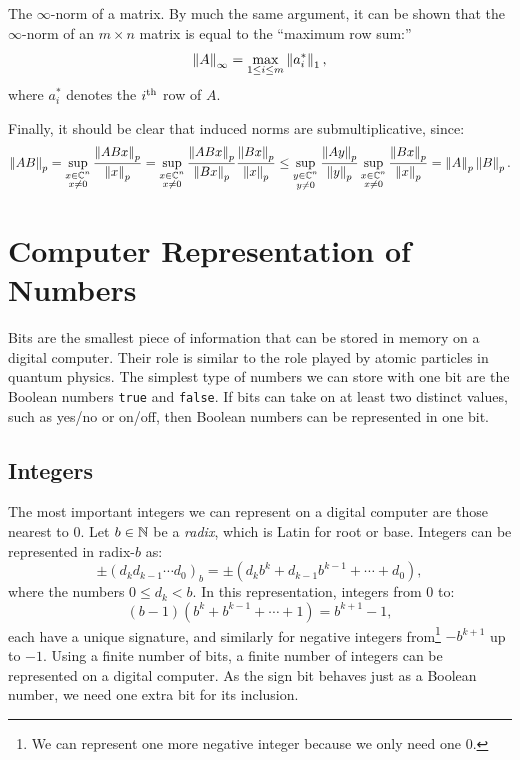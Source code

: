 \begin{example}
The $\infty$-norm of a matrix. By much the same argument, it can be shown that the $\infty$-norm of an $m\times n$ matrix is equal to the ``maximum row sum:''
\begin{equation}
\left\|{A}\right\|_\infty = \max_{1\le i\le m}\left\|{a_i^*}\right\|_1,
\end{equation}
where $a_i^*$ denotes the $i^{\rm th}$ row of $A$.
\end{example}

Finally, it should be clear that induced norms are submultiplicative, since:
\[
\left\|{AB}\right\|_p = \sup_{\substack{x\in\mathbb{C}^n\\x\ne0}}\dfrac{\left\|{ABx}\right\|_p}{\left\|{x}\right\|_p} = \sup_{\substack{x\in\mathbb{C}^n\\x\ne0}}\dfrac{\left\|{ABx}\right\|_p}{\left\|{Bx}\right\|_p}\dfrac{\left\|{Bx}\right\|_p}{\left\|{x}\right\|_p} \le \sup_{\substack{y\in\mathbb{C}^n\\y\ne0}}\dfrac{\left\|{Ay}\right\|_p}{\left\|{y}\right\|_p}\sup_{\substack{x\in\mathbb{C}^n\\x\ne0}}\dfrac{\left\|{Bx}\right\|_p}{\left\|{x}\right\|_p} = \left\|{A}\right\|_p\left\|{B}\right\|_p.
\]

\section{Computer Representation of Numbers}

Bits are the smallest piece of information that can be stored in memory on a digital computer. Their role is similar to the role played by atomic particles in quantum physics. The simplest type of numbers we can store with one bit are the Boolean numbers \verb+true+ and \verb+false+. If bits can take on at least two distinct values, such as yes/no or on/off, then Boolean numbers can be represented in one bit.

\subsection{Integers}

The most important integers we can represent on a digital computer are those nearest to $0$. Let $b\in\mathbb{N}$ be a {\em radix}, which is Latin for root or base. Integers can be represented in radix-$b$ as:
\[
\pm(d_kd_{k-1}\cdots d_0)_b = \pm\left(d_kb^k + d_{k-1}b^{k-1} + \cdots + d_0\right),
\]
where the numbers $0\le d_k < b$. In this representation, integers from $0$ to:
\[
(b-1)(b^k+b^{k-1}+\cdots+1) = b^{k+1}-1,
\]
each have a unique signature, and similarly for negative integers from\footnote{We can represent one more negative integer because we only need one $0$.} $-b^{k+1}$ up to $-1$. Using a finite number of bits, a finite number of integers can be represented on a digital computer. As the sign bit behaves just as a Boolean number, we need one extra bit for its inclusion.

